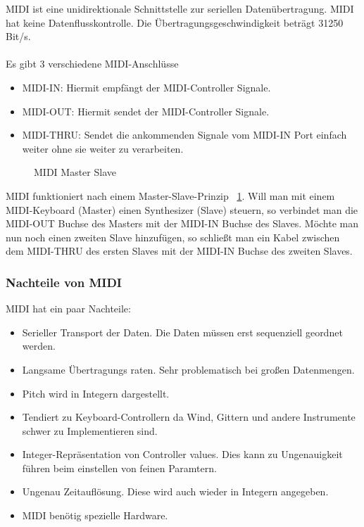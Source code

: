 \documentclass[a4paper, 12pt]{article}
\begin{document}
MIDI ist eine unidirektionale Schnittstelle zur seriellen Datenübertragung. MIDI hat keine Datenflusskontrolle. Die Übertragungsgeschwindigkeit beträgt 31250 Bit/s. \cite{MIDI} \\
\\
Es gibt 3 verschiedene MIDI-Anschlüsse 
\begin{itemize}
  \item MIDI-IN: Hiermit empfängt der MIDI-Controller Signale.
  \item MIDI-OUT: Hiermit sendet der MIDI-Controller Signale.
  \item MIDI-THRU: Sendet die ankommenden Signale vom MIDI-IN Port einfach weiter ohne sie weiter zu verarbeiten.
\end{itemize}
 \begin{figure}[htbp]
  \centering
  \caption[MIDI Master Slave \cite{MMS}]{MIDI Master Slave} 
  \label{fig:mms}
\end{figure}
MIDI funktioniert nach einem Master-Slave-Prinzip ~\ref{fig:mms}.
Will man mit einem MIDI-Keyboard (Master) einen Synthesizer (Slave) steuern, so verbindet man die MIDI-OUT Buchse des Masters mit der MIDI-IN Buchse des Slaves. Möchte man nun noch einen zweiten Slave hinzufügen, so schließt man ein Kabel zwischen dem MIDI-THRU des ersten Slaves mit der MIDI-IN Buchse des zweiten Slaves.

\subsubsection{Nachteile von MIDI}
MIDI hat ein paar Nachteile:
\begin{itemize}
\item Serieller Transport der Daten. Die Daten müssen erst sequenziell geordnet werden.
  \item Langsame Übertragungs raten. Sehr problematisch bei großen Datenmengen.
  \item Pitch wird in Integern dargestellt.
  \item Tendiert zu Keyboard-Controllern da Wind, Gittern und andere Instrumente schwer zu Implementieren sind.
  \item Integer-Repräsentation von Controller values. Dies kann zu Ungenauigkeit führen beim einstellen von feinen Paramtern.
  \item Ungenau Zeitauflösung. Diese wird auch wieder in Integern angegeben.
  \item MIDI benötig spezielle Hardware.
\end{itemize}
\end{document}
